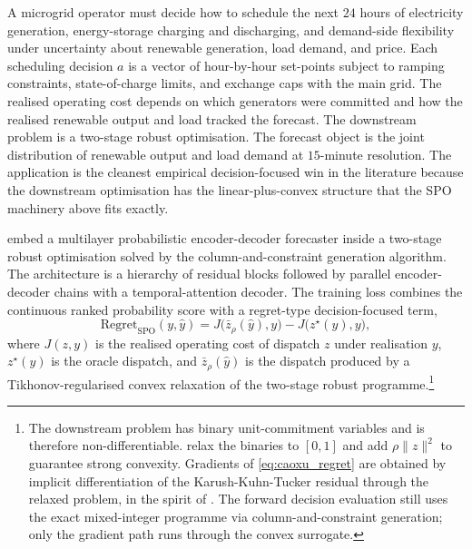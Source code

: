 A microgrid operator must decide how to schedule the next $24$ hours of
electricity generation, energy-storage charging and discharging, and
demand-side flexibility under uncertainty about renewable generation,
load demand, and price. Each scheduling decision $a$ is a vector of
hour-by-hour set-points subject to ramping constraints, state-of-charge
limits, and exchange caps with the main grid. The realised operating
cost depends on which generators were committed and how the realised
renewable output and load tracked the forecast. The downstream problem
is a two-stage robust optimisation. The forecast object is the joint
distribution of renewable output and load demand at $15$-minute
resolution. The application is the cleanest empirical decision-focused
win in the literature because the downstream optimisation has the
linear-plus-convex structure that the SPO machinery above fits exactly.

\citet{CaoXu2025} embed a multilayer probabilistic encoder-decoder
forecaster inside a two-stage robust optimisation solved by the
column-and-constraint generation algorithm. The architecture is a
hierarchy of residual blocks followed by parallel encoder-decoder
chains with a temporal-attention decoder. The training loss combines
the continuous ranked probability score with a regret-type
decision-focused term,
\begin{equation}
\mathrm{Regret}_{\mathrm{SPO}}(y, \hat y)
= J\bigl(\bar z_\rho(\hat y), y\bigr) - J\bigl(z^\star(y), y\bigr),
\label{eq:caoxu_regret}
\end{equation}
where $J(z, y)$ is the realised operating cost of dispatch $z$ under
realisation $y$, $z^\star(y)$ is the oracle dispatch, and
$\bar z_\rho(\hat y)$ is the dispatch produced by a Tikhonov-regularised
convex relaxation of the two-stage robust programme.\footnote{The
downstream problem has binary unit-commitment variables and is therefore
non-differentiable. \citet{CaoXu2025} relax the binaries to $[0, 1]$ and
add $\rho \|z\|^2$ to guarantee strong convexity. Gradients of
\eqref{eq:caoxu_regret} are obtained by implicit differentiation of the
Karush-Kuhn-Tucker residual through the relaxed problem, in the spirit
of \citet{DontiAmosKolter2017}. The forward decision evaluation still
uses the exact mixed-integer programme via column-and-constraint
generation; only the gradient path runs through the convex surrogate.}

